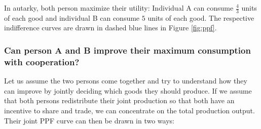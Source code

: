 {In autarky, both person maximize their utility: Individual A can consume $\frac{4}{3}$ units of each good and individual B can consume $5$ units of each good. The respective indifference curves are drawn in dashed blue lines in Figure \ref{fig:ppf}.
	
	\pbn

	
	
	
	\subsubsection{Can person A and B improve their maximum consumption with cooperation?}
	Let us assume the two persons come together and try to understand how they can improve by jointly deciding which goods they should produce. If we assume that both persons redistribute their joint production so that both have an incentive to share and trade, we can concentrate on the total production output. Their joint PPF curve can then be drawn in two ways: 
	
}
